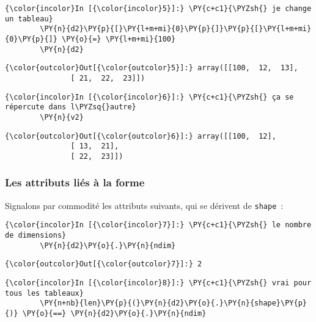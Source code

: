     \begin{Verbatim}[commandchars=\\\{\}]
{\color{incolor}In [{\color{incolor}5}]:} \PY{c+c1}{\PYZsh{} je change un tableau}
        \PY{n}{d2}\PY{p}{[}\PY{l+m+mi}{0}\PY{p}{]}\PY{p}{[}\PY{l+m+mi}{0}\PY{p}{]} \PY{o}{=} \PY{l+m+mi}{100}
        \PY{n}{d2}
\end{Verbatim}


\begin{Verbatim}[commandchars=\\\{\}]
{\color{outcolor}Out[{\color{outcolor}5}]:} array([[100,  12,  13],
               [ 21,  22,  23]])
\end{Verbatim}
            
    \begin{Verbatim}[commandchars=\\\{\}]
{\color{incolor}In [{\color{incolor}6}]:} \PY{c+c1}{\PYZsh{} ça se répercute dans l\PYZsq{}autre}
        \PY{n}{v2}
\end{Verbatim}


\begin{Verbatim}[commandchars=\\\{\}]
{\color{outcolor}Out[{\color{outcolor}6}]:} array([[100,  12],
               [ 13,  21],
               [ 22,  23]])
\end{Verbatim}
            
    \hypertarget{les-attributs-liuxe9s-uxe0-la-forme}{%
\subsubsection{Les attributs liés à la
forme}\label{les-attributs-liuxe9s-uxe0-la-forme}}

    Signalons par commodité les attributs suivants, qui se dérivent de
\texttt{shape}~:

    \begin{Verbatim}[commandchars=\\\{\}]
{\color{incolor}In [{\color{incolor}7}]:} \PY{c+c1}{\PYZsh{} le nombre de dimensions}
        \PY{n}{d2}\PY{o}{.}\PY{n}{ndim}
\end{Verbatim}


\begin{Verbatim}[commandchars=\\\{\}]
{\color{outcolor}Out[{\color{outcolor}7}]:} 2
\end{Verbatim}
            
    \begin{Verbatim}[commandchars=\\\{\}]
{\color{incolor}In [{\color{incolor}8}]:} \PY{c+c1}{\PYZsh{} vrai pour tous les tableaux}
        \PY{n+nb}{len}\PY{p}{(}\PY{n}{d2}\PY{o}{.}\PY{n}{shape}\PY{p}{)} \PY{o}{==} \PY{n}{d2}\PY{o}{.}\PY{n}{ndim}
\end{Verbatim}


